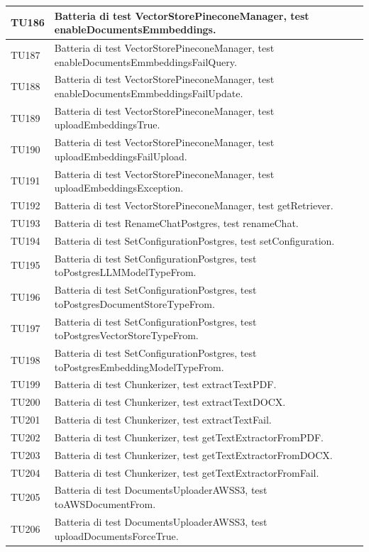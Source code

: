 \documentclass[10pt, a4paper]{article}
\begin{document}
\begin{xltabular}{\textwidth}{p{0.12\textwidth}|X}
\hline
TU186 & Batteria di test VectorStorePineconeManager, test enableDocumentsEmmbeddings. \\
\hline
TU187 & Batteria di test VectorStorePineconeManager, test enableDocumentsEmmbeddingsFailQuery. \\
\hline
TU188 & Batteria di test VectorStorePineconeManager, test enableDocumentsEmmbeddingsFailUpdate. \\
\hline
TU189 & Batteria di test VectorStorePineconeManager, test uploadEmbeddingsTrue. \\
\hline
TU190 & Batteria di test VectorStorePineconeManager, test uploadEmbeddingsFailUpload. \\
\hline
TU191 & Batteria di test VectorStorePineconeManager, test uploadEmbeddingsException. \\
\hline
TU192 & Batteria di test VectorStorePineconeManager, test getRetriever. \\
\hline
TU193 & Batteria di test RenameChatPostgres, test renameChat. \\
\hline
TU194 & Batteria di test SetConfigurationPostgres, test setConfiguration. \\
\hline
TU195 & Batteria di test SetConfigurationPostgres, test toPostgresLLMModelTypeFrom. \\
\hline
TU196 & Batteria di test SetConfigurationPostgres, test toPostgresDocumentStoreTypeFrom. \\
\hline
TU197 & Batteria di test SetConfigurationPostgres, test toPostgresVectorStoreTypeFrom. \\
\hline
TU198 & Batteria di test SetConfigurationPostgres, test toPostgresEmbeddingModelTypeFrom. \\
\hline
TU199 & Batteria di test Chunkerizer, test extractTextPDF. \\
\hline
TU200 & Batteria di test Chunkerizer, test extractTextDOCX. \\
\hline
TU201 & Batteria di test Chunkerizer, test extractTextFail. \\
\hline
TU202 & Batteria di test Chunkerizer, test getTextExtractorFromPDF. \\
\hline
TU203 & Batteria di test Chunkerizer, test getTextExtractorFromDOCX. \\
\hline
TU204 & Batteria di test Chunkerizer, test getTextExtractorFromFail. \\
\hline
TU205 & Batteria di test DocumentsUploaderAWSS3, test toAWSDocumentFrom. \\
\hline
TU206 & Batteria di test DocumentsUploaderAWSS3, test uploadDocumentsForceTrue. \\

\end{xltabular}
\end{document}

